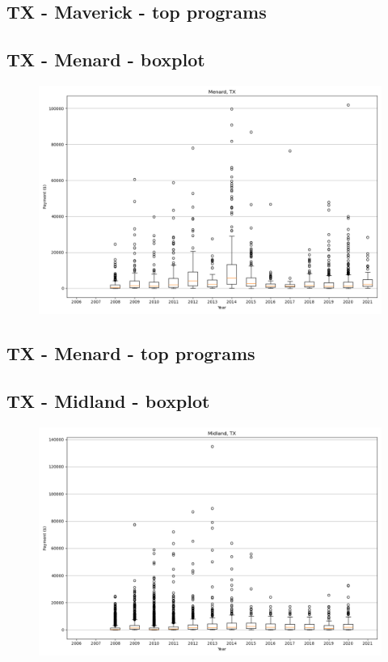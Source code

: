 \subsection*{TX - Maverick - top programs}

\newpage
\subsection*{TX - Menard - boxplot}
\begin{figure}[h]
\centering
\includegraphics[width=7in]{../output/boxplots/counties/Menard-TX_boxplot.png}
\end{figure}


\subsection*{TX - Menard - top programs}

\newpage
\subsection*{TX - Midland - boxplot}
\begin{figure}[h]
\centering
\includegraphics[width=7in]{../output/boxplots/counties/Midland-TX_boxplot.png}
\end{figure}


